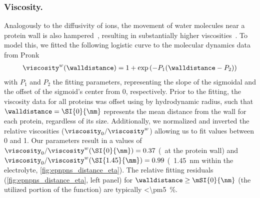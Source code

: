 \subsubsection{Viscosity.}
%
Analogously to the diffusivity of ions, the movement of water molecules near a protein wall is also
hampered~\cite{Makarov-1998}, resulting in substantially higher viscosities~\cite{Pronk-2014}. To model this,
we fitted the following logistic curve to the molecular dynamics data from Pronk \etal{}~\cite{Pronk-2014}
%
\begin{align}\label{eq:epnpns_distance_eta}
  \viscosity^w (\walldistance) = 1 + \exp{ \left( -P_1 (\walldistance - P_2) \right) }
\end{align}
%
with $P_1$ and $P_2$ the fitting parameters, representing the slope of the sigmoidal and the offset of the
sigmoid's center from 0, respectively. Prior to the fitting, the viscosity data for all proteins was offset
using by hydrodynamic radius, such that $\walldistance = \SI{0}{\nm}$ represents the mean distance from the
wall for each protein, regardless of its size. Additionally, we normalized and inverted the relative
viscosities ($\viscosity_0 / \viscosity^w$) allowing us to fit values between 0 and 1. Our parameters result
in a values of $\viscosity_0 / \viscosity^w (\SI{0}{\nm}) = 0.37$ (\ie~at the protein wall) and $\viscosity_0
/ \viscosity^w (\SI{1.45}{\nm}) = 0.99$ (\ie~\SI{1.45}{\nm} within the electrolyte,
\cref{fig:epnpns_distance_eta}). The relative fitting residuals (\cref{fig:epnpns_distance_eta}, left panel)
for $\walldistance \ge \mSI{0}{\nm}$ (the utilized portion of the function) are typically
\SI{<\pm5}{\percent}.

